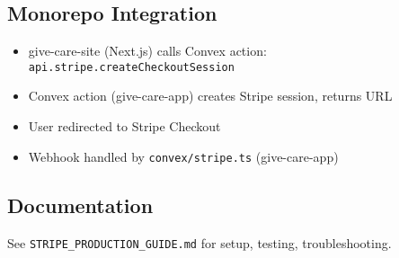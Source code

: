 \documentclass{article}
\begin{document}
\subsection*{Monorepo Integration}
\begin{itemize}
    \item give-care-site (Next.js) calls Convex action: \texttt{api.stripe.createCheckoutSession}
    \item Convex action (give-care-app) creates Stripe session, returns URL
    \item User redirected to Stripe Checkout
    \item Webhook handled by \texttt{convex/stripe.ts} (give-care-app)
\end{itemize}

\subsection*{Documentation}
See \texttt{STRIPE\_PRODUCTION\_GUIDE.md} for setup, testing, troubleshooting.
%
\end{document}
